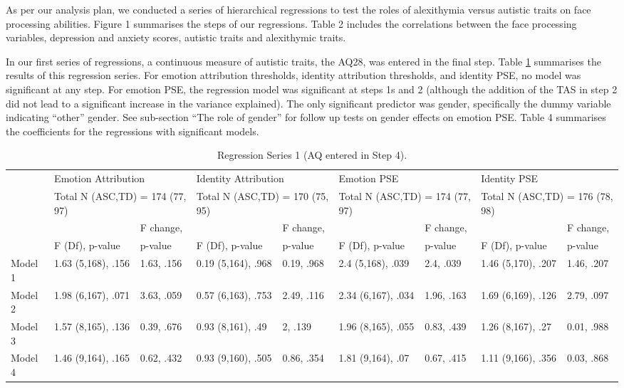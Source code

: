 \documentclass[
]{article}
\begin{document}
As per our analysis plan, we conducted a series of hierarchical regressions to test the roles of alexithymia versus autistic traits on face processing abilities. Figure 1 summarises the steps of our regressions. Table 2 includes the correlations between the face processing variables, depression and anxiety scores, autistic traits and alexithymic traits.

In our first series of regressions, a continuous measure of autistic traits, the AQ28, was entered in the final step. Table \ref{tab:table3} summarises the results of this regression series. For emotion attribution thresholds, identity attribution thresholds, and identity PSE, no model was significant at any step. For emotion PSE, the regression model was significant at steps 1s and 2 (although the addition of the TAS in step 2 did not lead to a significant increase in the variance explained). The only significant predictor was gender, specifically the dummy variable indicating ``other'' gender. See sub-section ``The role of gender'' for follow up tests on gender effects on emotion PSE. Table 4 summarises the coefficients for the regressions with significant models.

\begin{table}[H]

\caption{\label{tab:table3}Regression Series 1 (AQ entered in Step 4).}
\centering
\fontsize{5}{7}\selectfont
\begin{tabular}[t]{lllllllll}
\toprule
\multicolumn{1}{l}{} & \multicolumn{2}{l}{Emotion Attribution} & \multicolumn{2}{l}{Identity Attribution} & \multicolumn{2}{l}{Emotion PSE} & \multicolumn{2}{l}{Identity PSE} \\
\multicolumn{1}{l}{} & \multicolumn{2}{l}{Total N (ASC,TD) = 174 (77, 97)} & \multicolumn{2}{l}{Total N (ASC,TD) = 170 (75, 95)} & \multicolumn{2}{l}{Total N (ASC,TD) = 174 (77, 97)} & \multicolumn{2}{l}{Total N (ASC,TD) = 176 (78, 98)} \\
\cmidrule(l{3pt}r{3pt}){2-3} \cmidrule(l{3pt}r{3pt}){4-5} \cmidrule(l{3pt}r{3pt}){6-7} \cmidrule(l{3pt}r{3pt}){8-9}
 &  & F change, &  & F change, &  & F change, &  & F change,\\
 & F (Df), p-value & p-value & F (Df), p-value & p-value & F (Df), p-value & p-value & F (Df), p-value & p-value\\
\midrule
Model 1 & 1.63 (5,168), .156 & 1.63, .156 & 0.19 (5,164), .968 & 0.19, .968 & 2.4 (5,168), .039 & 2.4, .039 & 1.46 (5,170), .207 & 1.46, .207\\
Model 2 & 1.98 (6,167), .071 & 3.63, .059 & 0.57 (6,163), .753 & 2.49, .116 & 2.34 (6,167), .034 & 1.96, .163 & 1.69 (6,169), .126 & 2.79, .097\\
Model 3 & 1.57 (8,165), .136 & 0.39, .676 & 0.93 (8,161), .49 & 2, .139 & 1.96 (8,165), .055 & 0.83, .439 & 1.26 (8,167), .27 & 0.01, .988\\
\addlinespace
Model 4 & 1.46 (9,164), .165 & 0.62, .432 & 0.93 (9,160), .505 & 0.86, .354 & 1.81 (9,164), .07 & 0.67, .415 & 1.11 (9,166), .356 & 0.03, .868\\
\bottomrule
\end{tabular}
\end{table}
\end{document}
